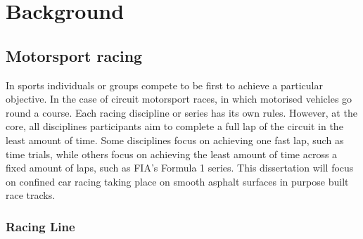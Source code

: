 \section{Background}
\label{sec:backgroud}

\subsection{Motorsport racing}

In sports individuals or groups compete to be first to achieve a particular objective. In the case of circuit motorsport races, in which motorised vehicles go round a course. Each racing discipline or series has its own rules. However, at the core, all disciplines participants aim to complete a full lap of the circuit in the least amount of time. Some disciplines focus on achieving one fast lap, such as time trials, while others focus on achieving the least amount of time across a fixed amount of laps, such as FIA's Formula 1 series. This dissertation will focus on confined car racing taking place on smooth asphalt surfaces in purpose built race tracks. 

\subsubsection{Racing Line}

